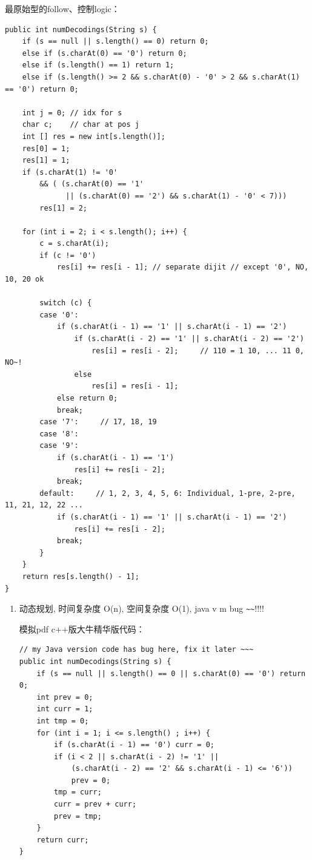 \documentclass[12pt]{book}
\begin{document}
最原始型的follow、控制logic：
\lstset{language=java,label= ,caption= ,numbers=none}
\begin{lstlisting}
public int numDecodings(String s) {
    if (s == null || s.length() == 0) return 0;
    else if (s.charAt(0) == '0') return 0;
    else if (s.length() == 1) return 1;
    else if (s.length() >= 2 && s.charAt(0) - '0' > 2 && s.charAt(1) == '0') return 0;

    int j = 0; // idx for s
    char c;    // char at pos j
    int [] res = new int[s.length()];
    res[0] = 1;
    res[1] = 1;
    if (s.charAt(1) != '0'
        && ( (s.charAt(0) == '1'
              || (s.charAt(0) == '2') && s.charAt(1) - '0' < 7)))
        res[1] = 2;

    for (int i = 2; i < s.length(); i++) {
        c = s.charAt(i);
        if (c != '0')
            res[i] += res[i - 1]; // separate dijit // except '0', NO, 10, 20 ok

        switch (c) {
        case '0':
            if (s.charAt(i - 1) == '1' || s.charAt(i - 1) == '2')
                if (s.charAt(i - 2) == '1' || s.charAt(i - 2) == '2')
                    res[i] = res[i - 2];     // 110 = 1 10, ... 11 0, NO~!
                else
                    res[i] = res[i - 1]; 
            else return 0;
            break;
        case '7':     // 17, 18, 19
        case '8':
        case '9':
            if (s.charAt(i - 1) == '1')
                res[i] += res[i - 2];
            break;
        default:     // 1, 2, 3, 4, 5, 6: Individual, 1-pre, 2-pre, 11, 21, 12, 22 ...
            if (s.charAt(i - 1) == '1' || s.charAt(i - 1) == '2')
                res[i] += res[i - 2];
            break;
        }
    }
    return res[s.length() - 1];
}
\end{lstlisting}
\begin{enumerate}
\item 动态规划, 时间复杂度 O(n), 空间复杂度 O(1), java v m bug \verb,~~,!!!!
\label{sec-14-2-8-1}

模拟pdf c++版大牛精华版代码： 
\lstset{language=java,label= ,caption= ,numbers=none}
\begin{lstlisting}
// my Java version code has bug here, fix it later ~~~
public int numDecodings(String s) {
    if (s == null || s.length() == 0 || s.charAt(0) == '0') return 0;
    int prev = 0;
    int curr = 1;
    int tmp = 0;
    for (int i = 1; i <= s.length() ; i++) {
        if (s.charAt(i - 1) == '0') curr = 0;
        if (i < 2 || s.charAt(i - 2) != '1' ||
            (s.charAt(i - 2) == '2' && s.charAt(i - 1) <= '6'))
            prev = 0;
        tmp = curr;
        curr = prev + curr;
        prev = tmp;
    }
    return curr;
}
\end{lstlisting}
\end{enumerate}
\end{document}
